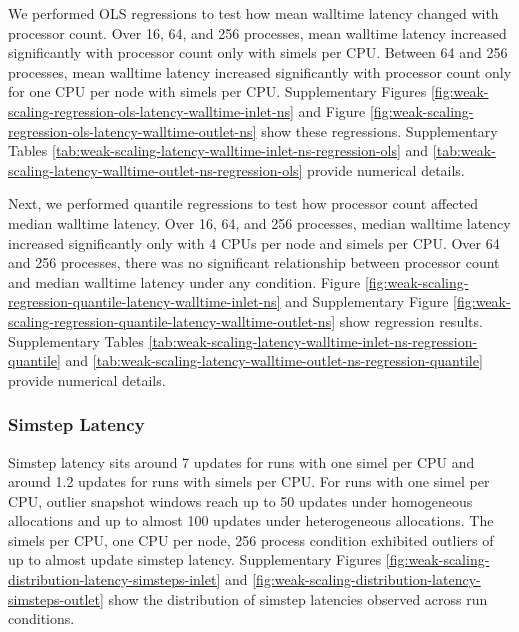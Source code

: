 We performed OLS regressions to test how mean walltime latency changed with processor count.
Over 16, 64, and 256 processes, mean walltime latency increased significantly with processor count only with  simels per CPU.
Between 64 and 256 processes, mean walltime latency increased significantly with processor count only for one CPU per node with  simels per CPU.
Supplementary Figures \ref{fig:weak-scaling-regression-ols-latency-walltime-inlet-ns} and Figure \ref{fig:weak-scaling-regression-ols-latency-walltime-outlet-ns} show these regressions.
Supplementary Tables \ref{tab:weak-scaling-latency-walltime-inlet-ns-regression-ols} and \ref{tab:weak-scaling-latency-walltime-outlet-ns-regression-ols} provide numerical details.



Next, we performed quantile regressions to test how processor count affected median walltime latency.
Over 16, 64, and 256 processes, median walltime latency increased significantly only with 4 CPUs per node and  simels per CPU.
Over 64 and 256 processes, there was no significant relationship between processor count and median walltime latency under any condition.
Figure \ref{fig:weak-scaling-regression-quantile-latency-walltime-inlet-ns} and Supplementary Figure \ref{fig:weak-scaling-regression-quantile-latency-walltime-outlet-ns} show regression results.
Supplementary Tables \ref{tab:weak-scaling-latency-walltime-inlet-ns-regression-quantile} and \ref{tab:weak-scaling-latency-walltime-outlet-ns-regression-quantile} provide numerical details.

\subsubsection{Simstep Latency}

Simstep latency sits around 7 updates for runs with one simel per CPU and around 1.2 updates for runs with  simels per CPU.
For runs with one simel per CPU, outlier snapshot windows reach up to 50 updates under homogeneous allocations and up to almost 100 updates under heterogeneous allocations.
The  simels per CPU, one CPU per node, 256 process condition exhibited outliers of up to almost  update simstep latency.
Supplementary Figures \ref{fig:weak-scaling-distribution-latency-simsteps-inlet} and \ref{fig:weak-scaling-distribution-latency-simsteps-outlet}  show the distribution of simstep latencies observed across run conditions.


